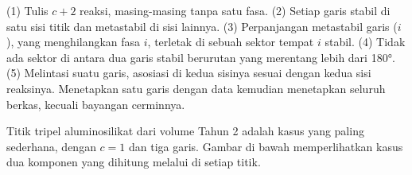 \begin{method}\label{met:b3:petrological-thermodynamics:schreinemakers}
(1) Tulis $c + 2$ reaksi, masing-masing tanpa satu fasa. (2) Setiap garis
stabil di satu sisi titik dan metastabil di sisi lainnya. (3) Perpanjangan
metastabil garis ($i$), yang menghilangkan fasa $i$, terletak di sebuah
sektor tempat $i$ stabil. (4) Tidak ada sektor di antara dua garis stabil berurutan
yang merentang lebih dari \ang{180}. (5) Melintasi suatu garis, asosiasi di kedua sisinya
sesuai dengan kedua sisi reaksinya. Menetapkan satu garis dengan data kemudian
menetapkan seluruh berkas, kecuali bayangan cerminnya.
\end{method}

Titik tripel aluminosilikat dari volume Tahun 2 adalah kasus yang paling sederhana,
dengan $c = 1$ dan tiga garis. Gambar di bawah memperlihatkan kasus dua komponen
yang dihitung melalui  di setiap titik.

